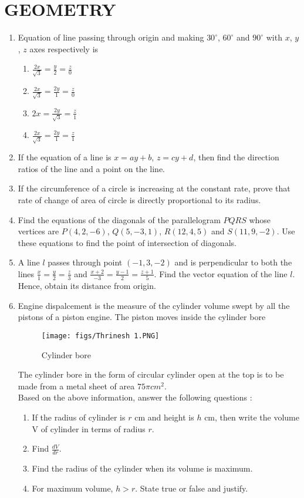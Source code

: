 \documentclass{article}
\begin{document}
\section{GEOMETRY}
\begin{enumerate}
\item Equation of line passing through origin and making $30^\circ$, $60^\circ$ and $90^\circ$ with $x$, $y$, $z$ axes respectively is
\begin{enumerate}
\item $\frac {2x}{\sqrt{3}} = \frac{y}{2} =\frac {z}{0}$
\item $\frac {2x}{\sqrt{3}} =\frac {2y}{1} =\frac {z}{0}$
\item $2x = \frac{2y}{\sqrt{3}} = \frac {z}{1}$
\item $\frac{2x}{\sqrt{3}} = \frac{2y}{1}= \frac{z}{1}$
\end{enumerate}
\item If the equation of a line is $x = ay + b$, $z = cy + d$, then find the direction ratios of the line and a point on the line.
\item If the circumference of a circle is increasing at the constant rate, prove that rate of change of  area of circle is directly proportional to its radius.
\item Find the equations of the diagonals of the parallelogram $PQRS$ whose vertices are $P(4, 2, -6)$, $Q(5, -3, 1)$, $R(12, 4, 5)$ and $S(11, 9, -2)$. Use these equations to find the point of intersection of diagonals.
\item A line $l$ passes through point $(-1, 3, -2)$ and is perpendicular to both the lines $\frac{x}{1} = \frac{y}{2} = \frac{z}{3}$ and $\frac{x + 2}{-3} = \frac{y-1}{2} = \frac{z + 1}{5}$. Find the vector equation of the line $l$. Hence, obtain its distance from origin.
\item Engine dispalcement is the measure of the cylinder volume swept by all the pistons of a piston engine. The piston moves inside the cylinder bore
\begin{figure}[H]
    \centering
	\texttt{[image: figs/Thrinesh 1.PNG]}
        \caption{Cylinder bore}
     \label{fig:fig-1}
\end{figure}
The cylinder bore in the form of circular cylinder open at the top is to be made from a metal sheet of area $75\pi cm^2$.\\
Based on the above information, answer the following questions :
\begin{enumerate}[label=(\roman*)]
\item If the radius of cylinder is $r$ cm and height is $h$ cm, then write the volume V of cylinder in terms of radius $r$.
\item  Find $\frac{dV}{dr}$.
\item  Find the radius of the cylinder when its volume is maximum.
\item For maximum volume, $h>r$. State true or false and justify.
\end{enumerate}
\end{enumerate}
\end{document}
